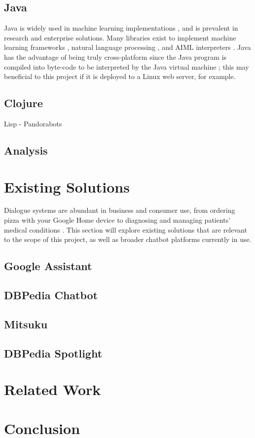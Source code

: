 \subsection{Java}
Java is widely used in machine learning implementations \cite{witten2005practical} \cite{abeel2009java}, and is prevalent in research and enterprise solutions. Many libraries exist to implement machine learning frameworks \cite{kovalev2016deep}, natural language processing \cite{nltk2019}, and AIML interpreters \cite{alice2013}. Java has the advantage of being truly cross-platform since the Java program is compiled into byte-code to be interpreted by the Java virtual machine \cite{witten2005practical}; this may beneficial to this project if it is deployed to a Linux web server, for example.\\

\subsection{Clojure}
Lisp - Pandorabots

\subsection{Analysis}

\cleardoublepage
\section{Existing Solutions}
Dialogue systems are abundant in business and consumer use, from ordering pizza with your Google Home device \cite{google2018dominos} to diagnosing and managing patients’ medical conditions \cite{yourmd2017}. This section will explore existing solutions that are relevant to the scope of this project, as well as broader chatbot platforms currently in use.

\subsection{Google Assistant}
\subsection{DBPedia Chatbot}
\subsection{Mitsuku}
\label{subsec:Mitsuku}

\subsection{DBPedia Spotlight}

\section{Related Work}

\section{Conclusion}





